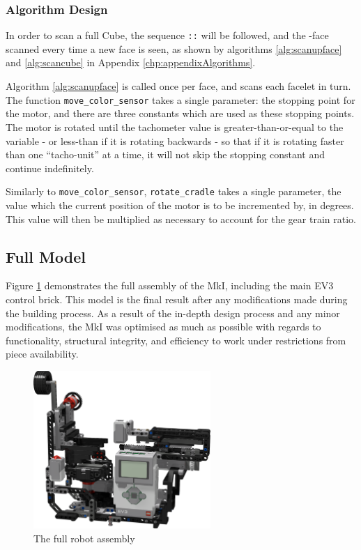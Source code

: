 \documentclass{report}
\newcommand{\movesequence}[1]{\uppercase{\texttt{:\formatmoves{#1}:}}}
\newcommand{\face}[1]{\uppercase{\texttt{\formatmovesnospace{#1}}}-face}
\begin{document}
	\subsubsection{Algorithm Design}

	In order to scan a full Cube, the sequence \movesequence{X.X.X.Y.X.X.X} will be followed, and the \face{u} scanned every time a new face is seen, as shown by algorithms \ref{alg:scanupface} and \ref{alg:scancube} in Appendix \autoref{chp:appendixAlgorithms}.
	
	Algorithm \ref{alg:scanupface} is called once per face, and scans each facelet in turn. The function \lstinline|move_color_sensor| takes a single parameter: the stopping point for the motor, and there are three constants which are used as these stopping points. The motor is rotated until the tachometer value is greater-than-or-equal to the variable - or less-than if it is rotating backwards - so that if it is rotating faster than one \enquote{tacho-unit} at a time, it will not skip the stopping constant and continue indefinitely.
	
	Similarly to \lstinline|move_color_sensor|, \lstinline|rotate_cradle| takes a single parameter, the value which the current position of the motor is to be incremented by, in degrees. This value will then be multiplied as necessary to account for the gear train ratio.

	\subsection{Full Model}
	
	Figure \ref{fig:rdrFullRobotV1} demonstrates the full assembly of the MkI, including the main EV3 control brick. This model is the final result after any modifications made during the building process. As a result of the in-depth design process and any minor modifications, the MkI was optimised as much as possible with regards to functionality, structural integrity, and efficiency to work under restrictions from piece availability.
	
	\begin{figure}[H]
		\centering
		\includegraphics[width=0.6\textwidth]{Resources/Images/rdrFullRobotV1.png}
		\caption{The full robot assembly}
		\label{fig:rdrFullRobotV1}
	\end{figure}
	
\end{document}
